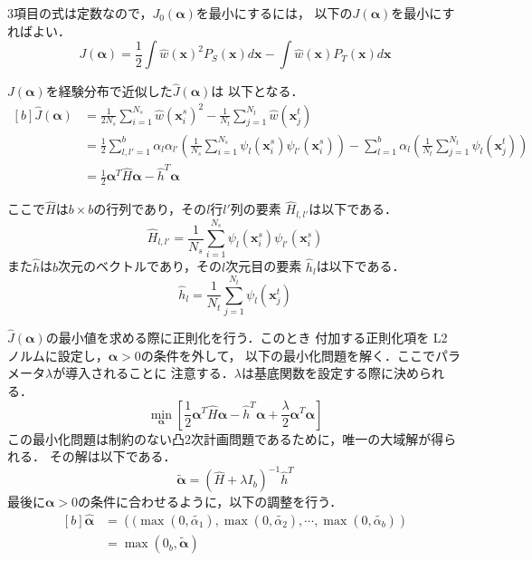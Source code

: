 \documentclass[japanese]{jnlp_1.4}
\begin{document}
3項目の式は定数なので，$J_0({\bm \alpha})$を最小にするには，
以下の$J({\bm \alpha})$を最小にすればよい．
\[
J({\bm \alpha}) =  \frac{1}{2} \int \hat{w}({\bm x})^2 P_S({\bm x})  d{\bm x}
  - \int \hat{w}({\bm x}) P_T({\bm x}) d{\bm x} 
\]

$J({\bm \alpha})$を経験分布で近似した$\widehat{J}({\bm \alpha})$は
以下となる．
\begin{equation}
\begin{aligned}[b]
\widehat{J}({\bm \alpha}) & = \frac{1}{2 N_s} \sum_{i=1}^{N_s} \widehat{w}({\bm x_i^s})^2 
  -  \frac{1}{N_t} \sum_{j=1}^{N_t} \widehat{w}({\bm x_j^t}) \\
 & = \frac{1}{2} \sum_{l,l'=1}^b \alpha_l \alpha_{l'} 
	 \left( \frac{1}{N_s} \sum_{i=1}^{N_s} \psi_l({\bm x_i^s}) \psi_{l'}({\bm x_i^s}) \right) 
	 - \sum_{l=1}^b  \alpha_l \left( \frac{1}{N_t} \sum_{j=1}^{N_t} \psi_l({\bm x_j^t})  \right) \\
 & =  \frac{1}{2} {\bm \alpha}^T \widehat{H} {\bm \alpha} - \widehat{h}^T {\bm \alpha}
\end{aligned}
\label{jhatalpha}
\end{equation}

ここで$\widehat{H}$は$b \times b$の行列であり，その$l$行$l'$列の要素
$\widehat{H}_{l,l'}$は以下である．
\[
\widehat{H}_{l,l'} = \frac{1}{N_s} \sum_{i=1}^{N_s}  \psi_l({\bm x_i^s}) \psi_{l'}({\bm x_i^s}) 
\]
また$\widehat{h}$は$b$次元のベクトルであり，その$l$次元目の要素
$\widehat{h}_l$は以下である．
\[
\widehat{h}_l = \frac{1}{N_t} \sum_{j=1}^{N_t} \psi_l({\bm x_j^t}) 
\]

$\widehat{J}({\bm \alpha})$の最小値を求める際に正則化を行う．このとき
付加する正則化項を L2 ノルムに設定し，${\bm \alpha} > 0$の条件を外して，
以下の最小化問題を解く．ここでパラメータ$\lambda$が導入されることに
注意する．$\lambda$は基底関数を設定する際に決められる．
\[
\min_{{\bm \alpha}} \left[ \frac{1}{2} {\bm \alpha}^T \widehat{H} {\bm \alpha}
-\widehat{h}^T {\bm \alpha} + \frac{\lambda}{2} {\bm \alpha}^T {\bm \alpha}
\right]
\]
この最小化問題は制約のない凸2次計画問題であるために，唯一の大域解が得られる．
その解は以下である．
\begin{equation}
    \label{eq:alp-kai1}
\tilde{{\bm \alpha}} = (\widehat{H} + \lambda I_b)^{-1} \widehat{h}^T    
\end{equation}
最後に${\bm \alpha} > 0$の条件に合わせるように，以下の調整を行う．
\begin{equation}
\begin{aligned}[b]
 \widehat{{\bm \alpha}} & = \left( (\max(0,\tilde{\alpha_1}),\max(0,\tilde{\alpha_2}), 
	\cdots, \max(0,\tilde{\alpha_b})            \right) \\
  & = \max( 0_b, \tilde{{\bm \alpha}})
\end{aligned}
\label{eq:alp-kai2}
\end{equation}
\end{document}
